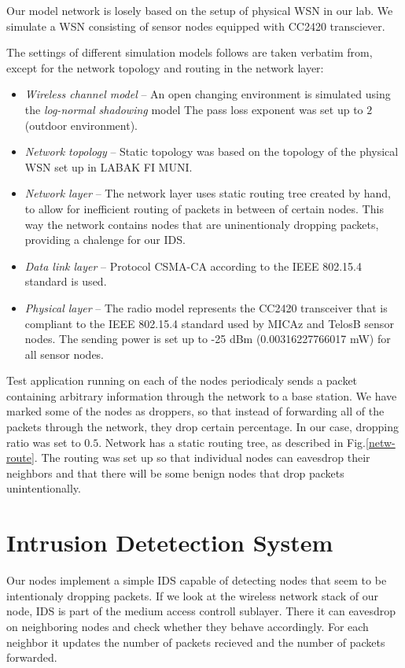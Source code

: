 \documentclass[12pt,oneside]{fithesis2}
\begin{document}
Our model network is losely based on the setup of physical WSN in our lab. We simulate a WSN consisting of sensor nodes equipped with CC2420 transciever.

The settings of different simulation models follows are taken verbatim from\cite{stehl2013opt}, except for the network topology and routing in the network layer:
\begin{itemize}
\item \textit{Wireless channel model} -- An open changing environment is simulated using the \textit{log-normal shadowing} model \cite{R01}  The pass loss exponent was set up to $2$ (outdoor environment). 

\item \textit{Network topology } -- Static topology was based on the topology of the physical WSN set up in LABAK FI MUNI.

\item \textit{Network layer} -- The network layer uses static routing tree created by hand, to allow for inefficient routing of packets in between of certain nodes. This way the network contains nodes that are uninentionaly dropping packets, providing a chalenge for our IDS.

\item \textit{Data link layer} -- Protocol CSMA-CA according to the IEEE 802.15.4 standard is used.

\item \textit{Physical layer} -- The radio model represents the CC2420 transceiver that is compliant to the IEEE 802.15.4 standard used by MICAz and TelosB sensor nodes. The sending power is set up to -25 dBm (0.00316227766017 mW) for all sensor nodes.
\end{itemize}

Test application running on each of the nodes periodicaly sends a packet containing arbitrary information through the network to a base station. 
We have marked some of the nodes as droppers, so that instead of forwarding all of the packets through the network, they drop certain percentage. In our case, dropping ratio was set to $0.5$. Network has a static routing tree, as described in Fig.\ref{netw-route}. The routing was set up so that individual nodes can eavesdrop their neighbors and that there will be some benign nodes that drop packets unintentionally.

\section{Intrusion Detetection System}
Our nodes implement a simple IDS capable of detecting nodes that seem to be intentionaly dropping packets.
If we look at the wireless network stack of our node, IDS is part of the medium access controll sublayer.
There it can eavesdrop on neighboring nodes and check whether they behave accordingly.
For each neighbor it updates the number of packets recieved and the number of packets forwarded.
\end{document}
